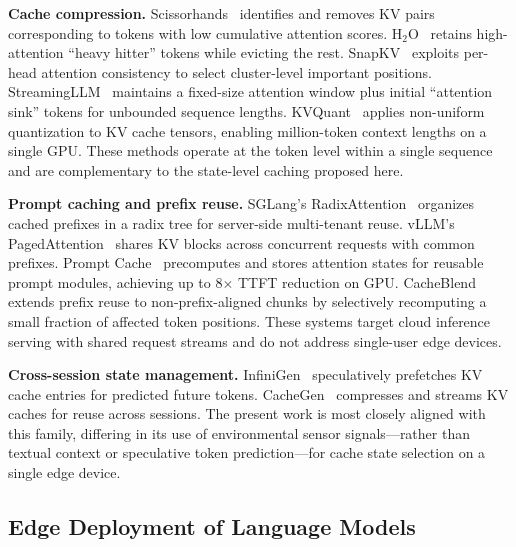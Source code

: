 \documentclass[journal]{IEEEtran}
\begin{document}
\textbf{Cache compression.} Scissorhands~\cite{scissorhands} identifies and removes KV pairs corresponding to tokens with low cumulative attention scores. H$_2$O~\cite{h2o} retains high-attention ``heavy hitter'' tokens while evicting the rest. SnapKV~\cite{snapkv} exploits per-head attention consistency to select cluster-level important positions. StreamingLLM~\cite{streamingllm} maintains a fixed-size attention window plus initial ``attention sink'' tokens for unbounded sequence lengths. KVQuant~\cite{kvquant} applies non-uniform quantization to KV cache tensors, enabling million-token context lengths on a single GPU. These methods operate at the token level within a single sequence and are complementary to the state-level caching proposed here.

\textbf{Prompt caching and prefix reuse.} SGLang's RadixAttention~\cite{sglang} organizes cached prefixes in a radix tree for server-side multi-tenant reuse. vLLM's PagedAttention~\cite{vllm} shares KV blocks across concurrent requests with common prefixes. Prompt Cache~\cite{promptcache} precomputes and stores attention states for reusable prompt modules, achieving up to 8$\times$ TTFT reduction on GPU. CacheBlend~\cite{cacheblend} extends prefix reuse to non-prefix-aligned chunks by selectively recomputing a small fraction of affected token positions. These systems target cloud inference serving with shared request streams and do not address single-user edge devices.

\textbf{Cross-session state management.} InfiniGen~\cite{infinigen} speculatively prefetches KV cache entries for predicted future tokens. CacheGen~\cite{cachegen} compresses and streams KV caches for reuse across sessions. The present work is most closely aligned with this family, differing in its use of environmental sensor signals---rather than textual context or speculative token prediction---for cache state selection on a single edge device.

\subsection{Edge Deployment of Language Models}
\label{sec:related_edge}
\end{document}
